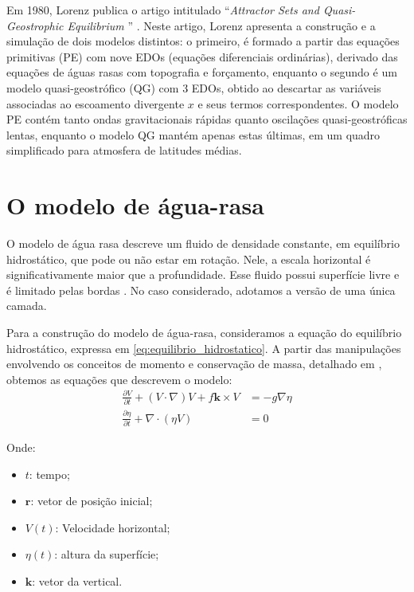 Em 1980, Lorenz publica o artigo intitulado ``\textit{Attractor Sets and Quasi-Geostrophic Equilibrium }'' \citep{Lorenz1980}. Neste artigo, Lorenz apresenta a construção e a simulação de dois modelos distintos: o primeiro, é formado a partir das equações primitivas (PE) com nove EDOs (equações diferenciais ordinárias), derivado das equações de águas rasas com topografia e forçamento, enquanto o segundo é um modelo quasi-geostrófico (QG) com 3 EDOs, obtido ao descartar as variáveis associadas ao escoamento divergente $x$ e seus termos correspondentes. O modelo PE contém tanto ondas gravitacionais rápidas quanto oscilações quasi-geostróficas lentas, enquanto o modelo QG mantém apenas estas últimas, em um quadro simplificado para atmosfera de latitudes médias.


\section{O modelo de água-rasa} \label{sec:ch01_agua_rasa}
O modelo de água rasa descreve um fluido de densidade constante, em equilíbrio hidrostático, que pode ou não estar em rotação. Nele, a escala horizontal é significativamente maior que a profundidade. Esse fluido possui superfície livre e é limitado pelas bordas \citep{Vallis2017}. No caso considerado, adotamos a versão de uma única camada.

Para a construção do modelo de água-rasa, consideramos a equação do equilíbrio hidrostático, expressa em \eqref{eq:equilibrio_hidrostatico}. A partir das manipulações envolvendo os conceitos de momento e conservação de massa, detalhado em \citet{Vallis2017}, obtemos as equações que descrevem o modelo: 
\begin{align}
	\frac{\partial V}{\partial t} + (V \cdot \nabla)V + f \mathbf{k} \times V & = -g \nabla \eta \label{eq:agua-rasa-1} \\
	\frac{\partial \eta}{\partial t} + \nabla \cdot (\eta V)                  & = 0 \label{eq:agua-rasa-2}              
\end{align}

Onde:
\begin{itemize}
	\item $t$: tempo;
	\item $\mathbf{r}$: vetor de posição inicial;
	\item $V(t)$: Velocidade horizontal;
	\item $\eta(t)$: altura da superfície;
	\item $\mathbf{k}$: vetor da vertical.
\end{itemize}

